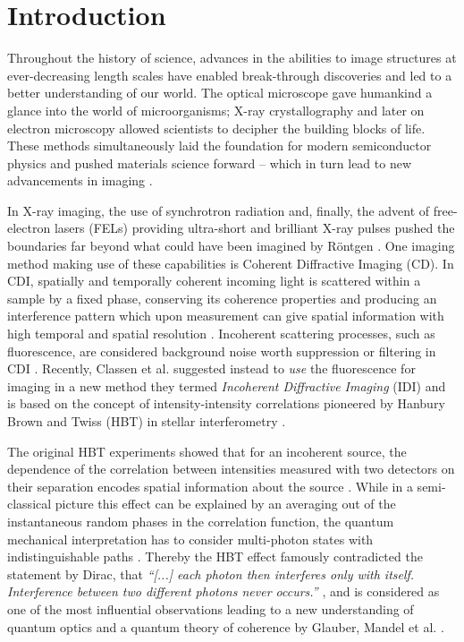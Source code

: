 \chapter{Introduction}
Throughout the history of science, advances in the abilities to image structures at ever-decreasing length scales have enabled break-through discoveries and led to a better understanding of our world.
The optical microscope gave humankind a glance into the world of microorganisms; X-ray crystallography and later on electron microscopy allowed scientists to decipher the building blocks of life\cite{hooke1665,laue1915,ruska1939,watson1953}. These methods simultaneously laid the foundation for modern semiconductor physics and pushed materials science forward
-- which in turn lead to new advancements in imaging \cite{teal1951,hovmoeller1984,jiang2018}.  

In X-ray imaging, the use of synchrotron radiation and, finally, the advent of free-electron lasers (FELs) providing ultra-short and brilliant X-ray pulses pushed the boundaries far beyond what could have been imagined by Röntgen \cite{cloetens1996,emma2010}. One imaging method making use of these capabilities is Coherent Diffractive Imaging (CD). In CDI, spatially and temporally coherent incoming light is scattered within a sample by a fixed phase, conserving its coherence properties and producing an interference pattern which upon measurement can give spatial information with high temporal and spatial resolution \cite{seibert2011,bostedt2010,barke2015}. Incoherent scattering processes, such as fluorescence, are considered background noise worth suppression or filtering in CDI \cite{schultz2013chapter7}.  Recently, Classen et al. suggested instead to \textit{use} the fluorescence for imaging in a new method they termed \textit{Incoherent Diffractive Imaging} (IDI) and is based on the concept of intensity-intensity correlations pioneered by Hanbury Brown and Twiss (HBT) in stellar interferometry \cite{classen2017,hanbury1956}. 

The original  HBT experiments showed that for an incoherent source, the dependence of the correlation between intensities measured with two detectors on their separation encodes spatial information about the source \cite{baym1997}. While in a semi-classical picture this effect can be explained by an averaging out of the instantaneous random phases in the correlation function, the quantum mechanical interpretation has to consider multi-photon states with indistinguishable paths \cite{fano1961,glauber2006}. Thereby the HBT effect famously contradicted the statement by Dirac, that \textit{\enquote{[...] each photon then interferes only with itself. Interference between two different photons never occurs.}} \cite{dirac1958}, and is considered as one of the most influential observations leading to a new understanding of quantum optics and a quantum theory of coherence by Glauber, Mandel et al. \cite{glauber1963,mandel1959, hong1987}.

